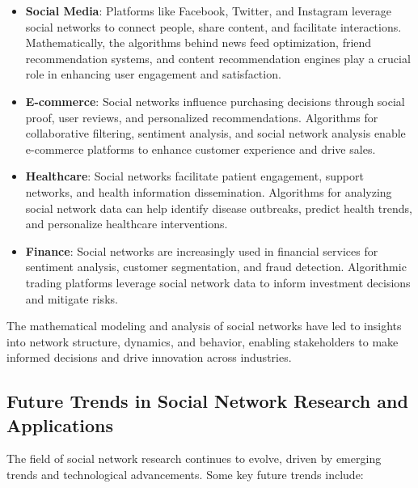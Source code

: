\documentclass[12pt]{book} %
\begin{document}
\begin{itemize}
    \item \textbf{Social Media}: Platforms like Facebook, Twitter, and Instagram leverage social networks to connect people, share content, and facilitate interactions. Mathematically, the algorithms behind news feed optimization, friend recommendation systems, and content recommendation engines play a crucial role in enhancing user engagement and satisfaction.
    
    \item \textbf{E-commerce}: Social networks influence purchasing decisions through social proof, user reviews, and personalized recommendations. Algorithms for collaborative filtering, sentiment analysis, and social network analysis enable e-commerce platforms to enhance customer experience and drive sales.
    
    \item \textbf{Healthcare}: Social networks facilitate patient engagement, support networks, and health information dissemination. Algorithms for analyzing social network data can help identify disease outbreaks, predict health trends, and personalize healthcare interventions.
    
    \item \textbf{Finance}: Social networks are increasingly used in financial services for sentiment analysis, customer segmentation, and fraud detection. Algorithmic trading platforms leverage social network data to inform investment decisions and mitigate risks.
\end{itemize}

The mathematical modeling and analysis of social networks have led to insights into network structure, dynamics, and behavior, enabling stakeholders to make informed decisions and drive innovation across industries.

\subsection{Future Trends in Social Network Research and Applications}

The field of social network research continues to evolve, driven by emerging trends and technological advancements. Some key future trends include:
\end{document}
